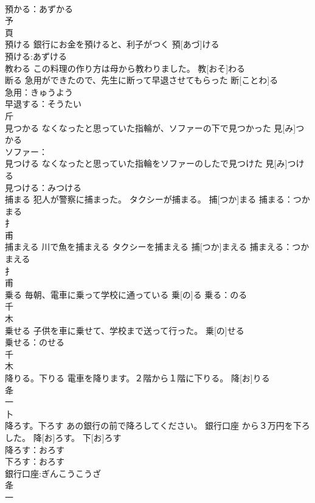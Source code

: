 \documentclass[8pt]{extreport}
\begin{document}
\begin{CJK}{UTF8}{min}
\\	預かる：あずかる
\\	予 
\\	頁 
\\	預ける	銀行にお金を預けると、利子がつく	預[あづ]ける	
\\	預ける:あずける
\\	教わる	この料理の作り方は母から教わりました。	教[おそ]わる			
\\	断る	急用ができたので、先生に断って早退させてもらった	断[ことわ]る	
\\	急用：きゅうよう
\\	早退する：そうたい
\\	斤 
\\	見つかる	なくなったと思っていた指輪が、ソファーの下で見つかった	見[み]つかる			
\\	ソファー：
\\	見つける	なくなったと思っていた指輪をソファーのしたで見つけた	見[み]つける	
\\	見つける：みつける
\\	捕まる	犯人が警察に捕まった。 タクシーが捕まる。	捕[つか]まる			捕まる：つかまる
\\	扌 
\\	甫 
\\	捕まえる	川で魚を捕まえる タクシーを捕まえる	捕[つか]まえる			捕まえる：つかまえる
\\	扌 
\\	甫 
\\	乗る	毎朝、電車に乗って学校に通っている	乗[の]る			乗る：のる
\\	千 
\\	木 
\\	乗せる	子供を車に乗せて、学校まで送って行った。	乗[の]せる	
\\	乗せる：のせる
\\	千 
\\	木 
\\	降りる。下りる	電車を降ります。２階から１階に下りる。	降[お]りる					
\\	夅 
\\	一 
\\	卜 
\\	降ろす。下ろす	あの銀行の前で降ろしてください。 銀行口座 から３万円を下ろした。	降[お]ろす。 下[お]ろす	
\\	降ろす：おろす
\\	下ろす：おろす
\\	銀行口座:ぎんこうこうざ
\\	夅 
\\	一 

\end{CJK}
\end{document}
